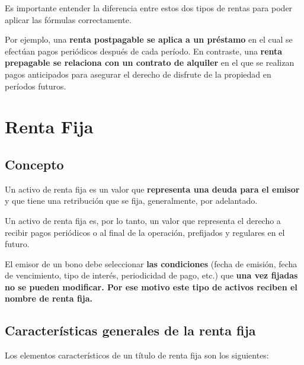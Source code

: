 \documentclass[
  letterpaper,
  DIV=11,
  numbers=noendperiod]{scrreprt}
\begin{document}
\begin{tcolorbox}
\begin{tcolorbox}[enhanced jigsaw, toprule=.15mm, left=2mm, arc=.35mm, breakable, bottomrule=.15mm, opacityback=0, rightrule=.15mm, leftrule=.75mm, colframe=quarto-callout-warning-color-frame, colback=white]
\begin{minipage}[t]{\textwidth - 5.5mm}
\end{minipage}%
\end{tcolorbox}

Es importante entender la diferencia entre estos dos tipos de rentas
para poder aplicar las fórmulas correctamente.

Por ejemplo, una \textbf{renta postpagable se aplica a un préstamo} en
el cual se efectúan pagos periódicos después de cada período. En
contraste, una \textbf{renta prepagable se relaciona con un contrato de
alquiler} en el que se realizan pagos anticipados para asegurar el
derecho de disfrute de la propiedad en períodos futuros.

\section{Renta Fija}\label{renta-fija}

\subsection{Concepto}\label{concepto-1}

Un activo de renta fija es un valor que \textbf{representa una deuda
para el emisor} y que tiene una retribución que se fija, generalmente,
por adelantado.

Un activo de renta fija es, por lo tanto, un valor que representa el
derecho a recibir pagos periódicos o al final de la operación,
prefijados y regulares en el futuro.

El emisor de un bono debe seleccionar \textbf{las condiciones} (fecha de
emisión, fecha de vencimiento, tipo de interés, periodicidad de pago,
etc.) que \textbf{una vez fijadas no se pueden modificar. Por ese motivo
este tipo de activos reciben el nombre de renta fija.}

\subsection{Características generales de la renta
fija}\label{caracteruxedsticas-generales-de-la-renta-fija}

Los elementos característicos de un título de renta fija son los
siguientes:


\end{tcolorbox}
\end{document}
